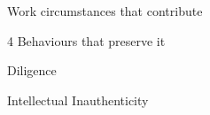 \documentclass[aspectratio=169]{beamer}
\begin{document}
\begin{frame}
  \begin{center}
    \Huge Work circumstances that contribute
    \\ \small \cite{hh15}
  \end{center}
\end{frame}


\begin{frame}
  \begin{center}
    \Huge 4 Behaviours that preserve it
  \end{center}
\end{frame}

\begin{frame}
  \begin{center}
    \Huge Diligence
    \\ \small \cite{clanceimes78}

  \end{center}
\end{frame}

\begin{frame}
  \begin{center}
    \Huge Intellectual Inauthenticity

    \\ \small \cite{clanceimes78}
  \end{center}
\end{frame}
\end{document}
